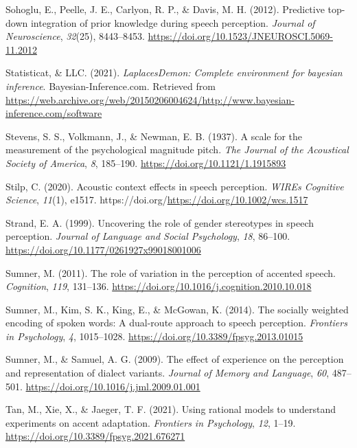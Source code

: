 \documentclass[
  11pt,
  english,
  man,floatsintext]{apa6}
\newlength{\cslhangindent}
\newlength{\cslentryspacingunit} %
\newenvironment{CSLReferences}[2] %
 {%
  \setlength{\parindent}{0pt}
  \ifodd #1
  \let\oldpar\par
  \def\par{\hangindent=\cslhangindent\oldpar}
  \fi
  \setlength{\parskip}{#2\cslentryspacingunit}
 }%
 {}
\begin{document}
\begin{CSLReferences}{1}{0}
\leavevmode{}%
Sohoglu, E., Peelle, J. E., Carlyon, R. P., \& Davis, M. H. (2012). Predictive top-down integration of prior knowledge during speech perception. \emph{Journal of Neuroscience}, \emph{32}(25), 8443--8453. \url{https://doi.org/10.1523/JNEUROSCI.5069-11.2012}

\leavevmode{}%
Statisticat, \& LLC. (2021). \emph{LaplacesDemon: Complete environment for bayesian inference}. Bayesian-Inference.com. Retrieved from \url{https://web.archive.org/web/20150206004624/http://www.bayesian-inference.com/software}

\leavevmode{}%
Stevens, S. S., Volkmann, J., \& Newman, E. B. (1937). A scale for the measurement of the psychological magnitude pitch. \emph{The Journal of the Acoustical Society of America}, \emph{8}, 185--190. \url{https://doi.org/10.1121/1.1915893}

\leavevmode{}%
Stilp, C. (2020). Acoustic context effects in speech perception. \emph{WIREs Cognitive Science}, \emph{11}(1), e1517. https://doi.org/\url{https://doi.org/10.1002/wcs.1517}

\leavevmode{}%
Strand, E. A. (1999). Uncovering the role of gender stereotypes in speech perception. \emph{Journal of Language and Social Psychology}, \emph{18}, 86--100. \url{https://doi.org/10.1177/0261927x99018001006}

\leavevmode{}%
Sumner, M. (2011). The role of variation in the perception of accented speech. \emph{Cognition}, \emph{119}, 131--136. \url{https://doi.org/10.1016/j.cognition.2010.10.018}

\leavevmode{}%
Sumner, M., Kim, S. K., King, E., \& McGowan, K. (2014). The socially weighted encoding of spoken words: A dual-route approach to speech perception. \emph{Frontiers in Psychology}, \emph{4}, 1015--1028. \url{https://doi.org/10.3389/fpsyg.2013.01015}

\leavevmode{}%
Sumner, M., \& Samuel, A. G. (2009). The effect of experience on the perception and representation of dialect variants. \emph{Journal of Memory and Language}, \emph{60}, 487--501. \url{https://doi.org/10.1016/j.jml.2009.01.001}

\leavevmode{}%
Tan, M., Xie, X., \& Jaeger, T. F. (2021). Using rational models to understand experiments on accent adaptation. \emph{Frontiers in Psychology}, \emph{12}, 1--19. \url{https://doi.org/10.3389/fpsyg.2021.676271}


\end{CSLReferences}
\end{document}
